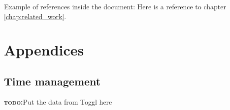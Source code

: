 \documentclass[BSP,english,oneside]{classes/gucthesis}
\newcommand{\comment}[1]{\textcolor{blue}{\emph{#1}}}
\newcommand{\todo}[1]{{\par\noindent\textbf{\textsc{\color{Gray}todo:}}\color{green}#1}}
\begin{document}
Example of references inside the document:
	Here is a reference to chapter \ref{chap:related_work}.



\part{Appendices}

\appendix %




\printnoidxglossary[sort=word]

\chapter{Time management}
	\todo{Put the data from Toggl here}




% 

% 

% 


\end{document}
